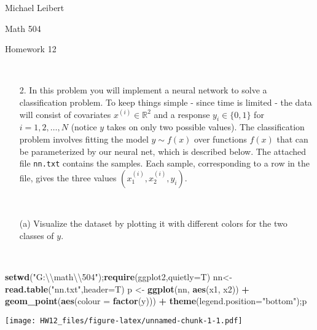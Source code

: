 \documentclass[]{article}
\title{}
\author{}
\date{}
\newenvironment{Shaded}{\begin{snugshade}}{\end{snugshade}}
\newcommand{\KeywordTok}[1]{\textcolor[rgb]{0.13,0.29,0.53}{\textbf{#1}}}
\newcommand{\DataTypeTok}[1]{\textcolor[rgb]{0.13,0.29,0.53}{#1}}
\newcommand{\CharTok}[1]{\textcolor[rgb]{0.31,0.60,0.02}{#1}}
\newcommand{\StringTok}[1]{\textcolor[rgb]{0.31,0.60,0.02}{#1}}
\newcommand{\OperatorTok}[1]{\textcolor[rgb]{0.81,0.36,0.00}{\textbf{#1}}}
\newcommand{\NormalTok}[1]{#1}
\begin{document}
Michael Leibert

Math 504

Homework 12

~

\begin{itemize} 


\item[2.] In this problem you will implement a neural network to solve a classification problem.   To keep things simple - since time is limited - the data will consist of covariates $x^{(i)} \in \mathbb{R}^2$ and a response $y_i \in \{0,1\}$ for $i=1,2,\dots,N$ (notice $y$ takes on only two possible values).  The classification problem involves fitting the model $y \sim f(x)$ over functions $f(x)$ that can be parameterized by our neural net, which is described below.   The attached file \verb+nn.txt+ contains the samples.  Each sample, corresponding to a row in the file, gives the three values $(x^{(i)}_1, x^{(i)}_2, y_i)$.  
\end{itemize}

~

\begin{itemize} \item[(a)] Visualize the dataset by plotting it with different colors for the two classes of $y$.  
\end{itemize}

~

\begin{Shaded}
\begin{Highlighting}[]
\KeywordTok{setwd}\NormalTok{(}\StringTok{"G:}\CharTok{\textbackslash{}\textbackslash{}}\StringTok{math}\CharTok{\textbackslash{}\textbackslash{}}\StringTok{504"}\NormalTok{);}\KeywordTok{require}\NormalTok{(ggplot2,}\DataTypeTok{quietly=}\NormalTok{T)}
\NormalTok{nn<-}\KeywordTok{read.table}\NormalTok{(}\StringTok{"nn.txt"}\NormalTok{,}\DataTypeTok{header=}\NormalTok{T)   }
\NormalTok{p <-}\StringTok{ }\KeywordTok{ggplot}\NormalTok{(nn, }\KeywordTok{aes}\NormalTok{(x1, x2)) }\OperatorTok{+}\StringTok{ }\KeywordTok{geom_point}\NormalTok{(}\KeywordTok{aes}\NormalTok{(}\DataTypeTok{colour =} \KeywordTok{factor}\NormalTok{(y))) }\OperatorTok{+}\StringTok{   }
\StringTok{  }\KeywordTok{theme}\NormalTok{(}\DataTypeTok{legend.position=}\StringTok{"bottom"}\NormalTok{);p }
\end{Highlighting}
\end{Shaded}

\texttt{[image: HW12\_files/figure-latex/unnamed-chunk-1-1.pdf]}
\end{document}
